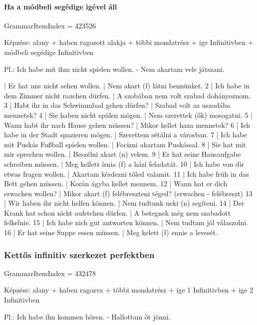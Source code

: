 \documentclass{article}
\newenvironment{desc}{\verbatim}{\endverbatim}
\newenvironment{exmp}{\verbatim}{\endverbatim}
\begin{document}
\paragraph{Ha a módbeli segédige igével áll}

GrammarItemIndex = 423526

\begin{desc}
Képzése:
alany + haben ragozott alakja + többi mondatrész + ige Infinitivben + módbeli segédige Infinitivben

Pl.: Ich habe mit ihm nicht spielen wollen. - Nem akartam vele játszani.
\end{desc}

\begin{exmp}
1 | Er hat uns nicht sehen wollen. | Nem akart (f) látni bennünket.
2 | Ich habe in dem Zimmer nicht rauchen dürfen. | A szobában nem volt szabad dohányoznom.
3 | Habt ihr in das Schwimmbad gehen dürfen? | Szabad volt az uszodába mennetek?
4 | Sie haben nicht spülen mögen. | Nem szerettek (ők) mosogatni.
5 | Wann habt ihr nach Hause gehen müssen? | Mikor kellet haza mennetek?
6 | Ich habe in der Stadt spazieren mögen. | Szerettem sétálni a városban.
7 | Ich habe mit Puskás Fußball spielen wollen. | Focizni akartam Puskással.
8 | Sie hat mit mir sprechen wollen. | Beszélni akart (n) velem.
9 | Er hat seine Hausaufgabe schreiben müssen. | Meg kellett írnia (f) a házi feladatát.
10 | Ich habe von dir etwas fragen wollen. | Akartam kérdezni tőled valamit.
11 | Ich habe früh in das Bett gehen müssen. | Korán ágyba kellet mennem.
12 | Wann hat er dich erwachen wollen? | Mikor akart (f) felébreszteni téged? (erwachen - felébreszt)
13 | Wir haben ihr nicht helfen können. | Nem tudtunk neki (n) segíteni.
14 | Der Krank hat schon nicht aufstehen dürfen. | A betegnek még nem szabadott felkelnie.
15 | Ich habe nich gut antworten können. | Nem tudtam jól válaszolni.
16 | Er hat seine Suppe essen müssen. | Meg kelett (f) ennie a levesét.
\end{exmp}

\subsubsection{Kettős infinitiv szerkezet perfektben}

GrammarItemIndex = 432478

\begin{desc}
Képzése:
alany + haben ragozva + többi mondatrész + ige 1 Infinitivben + ige 2 Infinitivben

Pl.: Ich habe ihn kommen hören. - Hallottam őt jönni.
\end{desc}
\end{document}
